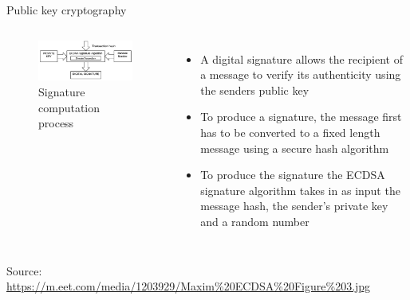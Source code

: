 \documentclass[10pt]{beamer}
\begin{document}
\begin{frame}{Public key cryptography}
	\begin{columns}
		\begin{figure}[]
			\centering
			\includegraphics  [scale=0.4]{Images/ECDSA1}
			\caption{Signature computation process}
		\end{figure}
		\begin{itemize}
			\item A digital signature allows the recipient of a message to verify its authenticity using the senders public key
			\item To produce a signature, the message first has to be converted to a fixed length message using a secure hash algorithm
			\item To produce the signature the ECDSA signature algorithm takes in as input the message hash, the sender's private key and a random number
		\end{itemize}
	\end{columns}
	\begin{tiny}
		Source: \href{https://eng.paxos.com/blockchain-separating-hype-from-substance-part-2}{https://m.eet.com/media/1203929/Maxim\%20ECDSA\%20Figure\%203.jpg}
	\end{tiny}
\end{frame}



\end{document}
